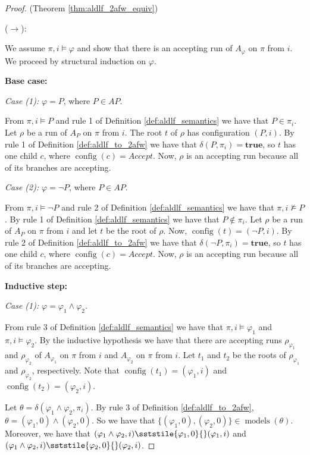 \documentclass[10pt,a4paper]{amsart}
\theoremstyle{plain}
\theoremstyle{definition}
\theoremstyle{definition}
\newcommand{\sderives}[1]{\sststile{#1}{}}
\DeclareMathOperator{\config}{config}
\DeclareMathOperator{\?}{?}
\DeclareMathOperator{\mymodels}{models}
\begin{document}
\begin{proof} (Theorem \ref{thm:aldlf_2afw_equiv})

    ($\rightarrow$):

    We assume $\pi,i \models \varphi$ and show that there is an accepting run of $A_\varphi$ on $\pi$ from $i$.
    We proceed by structural induction on $\varphi$.

    \textbf{Base case:}

    \textit{Case (1):} $\varphi = P$, where $P \in AP$.

    From $\pi,i \models P$ and rule 1 of Definition \ref{def:aldlf_semantics} we have that $P \in \pi_i$.  Let $\rho$ be
    a run of $A_P$ on $\pi$ from $i$. The root $t$ of $\rho$ has configuration $(P,i)$. By rule 1 of Definition \ref{def:aldlf_to_2afw}
    we have that $\delta(P,\pi_i) = \textbf{true}$, so $t$ has one child $c$, where $\config(c) = Accept$. Now, $\rho$ is an accepting
    run because all of its branches are accepting.

    \textit{Case (2):} $\varphi = \neg P$, where $P \in AP$.

    From $\pi,i \models \neg P$ and rule 2 of Definition \ref{def:aldlf_semantics} we have that $\pi,i \not\models P$. By rule
    1 of Definition \ref{def:aldlf_semantics} we have that $P \not\in \pi_i$. Let $\rho$ be a run of $A_P$ on $\pi$ from $i$ and let
    $t$ be the root of $\rho$. Now, $\config(t) = (\neg P,i)$. By rule 2 of Definition \ref{def:aldlf_to_2afw}
    we have that $\delta(\neg P,\pi_i) = \textbf{true}$, so $t$ has one child $c$, where $\config(c) = Accept$. Now, $\rho$ is an
    accepting run because all of its branches are accepting.

    \textbf{Inductive step:}

    \textit{Case (1):} $\varphi = \varphi_1 \wedge \varphi_2$.

    From rule 3 of Definition \ref{def:aldlf_semantics} we have that
    $\pi,i \models \varphi_1$ and $\pi,i \models \varphi_2$.
    By the inductive hypothesis we have that there are accepting runs $\rho_{\varphi_1}$ and $\rho_{\varphi_2}$ of $A_{\varphi_1}$
    on $\pi$ from $i$
    and $A_{\varphi_2}$ on $\pi$ from $i$. Let $t_1$ and $t_2$ be the roots of $\rho_{\varphi_1}$ and $\rho_{\varphi_2}$, respectively.
    Note that $\config(t_1) = (\varphi_1,i)$ and $\config(t_2) = (\varphi_2,i)$.

    Let $\theta = \delta(\varphi_1 \wedge \varphi_2,\pi_i)$. By rule 3 of Definition \ref{def:aldlf_to_2afw},
    $\theta = (\varphi_1,0) \wedge (\varphi_2,0)$. So we have that
    $\{(\varphi_1,0), (\varphi_2,0)\} \in \mymodels(\theta)$.
    Moreover, we have that $(\varphi_1 \wedge \varphi_2,i) \sderives{\varphi_1,0} (\varphi_1,i)$
    and $(\varphi_1 \wedge \varphi_2,i) \sderives{\varphi_2,0} (\varphi_2,i)$.


\end{proof}
\end{document}
